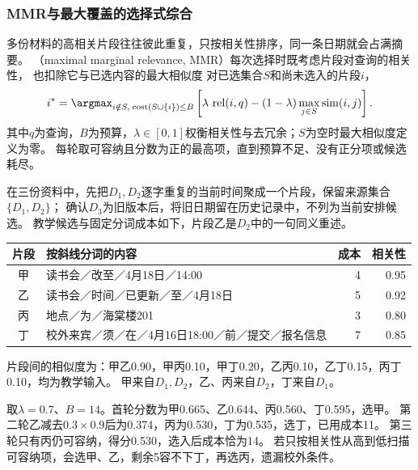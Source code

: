 \subsubsection{MMR与最大覆盖的选择式综合}
\label{sec:nlp-generation-mmr}

多份材料的高相关片段往往彼此重复，只按相关性排序，同一条日期就会占满摘要。
（maximal marginal relevance, MMR）每次选择时既考虑片段对查询的相关性，
也扣除它与已选内容的最大相似度
对已选集合$S$和尚未选入的片段$i$，
\begin{equation}
  i^*=\argmax_{i\notin S,\;\operatorname{cost}(S\cup\{i\})\leq B}
  \left[\lambda\,\operatorname{rel}(i,q)
  -(1-\lambda)\max_{j\in S}\operatorname{sim}(i,j)\right].
  \label{eq:nlp-generation-mmr}
\end{equation}
其中$q$为查询，$B$为预算，$\lambda\in[0,1]$权衡相关性与去冗余；$S$为空时最大相似度定义为零。
每轮取可容纳且分数为正的最高项，直到预算不足、没有正分项或候选耗尽。

在三份资料中，先把$D_1,D_2$逐字重复的当前时间聚成一个片段，保留来源集合$\{D_1,D_2\}$；
确认$D_3$为旧版本后，将旧日期留在历史记录中，不列为当前安排候选。
教学候选与固定分词成本如下，片段乙是$D_2$中的一句同义重述。

\begin{fullwidth}
\begin{center}
  \begin{tabular}{@{}clrr@{}}
    \toprule
    片段 & 按斜线分词的内容 & 成本 & 相关性\\
    \midrule
    甲 & 读书会／改至／4月18日／14:00 & 4 & 0.95\\
    乙 & 读书会／时间／已更新／至／4月18日 & 5 & 0.92\\
    丙 & 地点／为／海棠楼201 & 3 & 0.80\\
    丁 & 校外来宾／须／在／4月16日18:00／前／提交／报名信息 & 7 & 0.85\\
    \bottomrule
  \end{tabular}
\end{center}
\end{fullwidth}
片段间的相似度为：甲乙0.90，甲丙0.10，甲丁0.20，乙丙0.10，乙丁0.15，丙丁0.10，均为教学输入。
甲来自$D_1,D_2$，乙、丙来自$D_2$，丁来自$D_1$。

取$\lambda=0.7$、$B=14$。首轮分数为甲0.665、乙0.644、丙0.560、丁0.595，选甲。
第二轮乙减去$0.3\times0.9$后为0.374，丙为0.530，丁为0.535，选丁，已用成本11。
第三轮只有丙仍可容纳，得分0.530，选入后成本恰为14。
若只按相关性从高到低扫描可容纳项，会选甲、乙，剩余5容不下丁，再选丙，遗漏校外条件。

